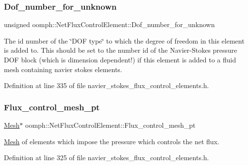 \subsubsection{\texorpdfstring{Dof\+\_\+number\+\_\+for\+\_\+unknown}{Dof\_number\_for\_unknown}}
{\footnotesize\ttfamily unsigned oomph\+::\+Net\+Flux\+Control\+Element\+::\+Dof\+\_\+number\+\_\+for\+\_\+unknown\hspace{0.3cm}{\ttfamily [private]}}



The id number of the \char`\"{}\+D\+O\+F type\char`\"{} to which the degree of freedom in this element is added to. This should be set to the number id of the Navier-\/\+Stokes pressure D\+OF block (which is dimension dependent!) if this element is added to a fluid mesh containing navier stokes elements. 



Definition at line 335 of file navier\+\_\+stokes\+\_\+flux\+\_\+control\+\_\+elements.\+h.

\mbox{\label{classoomph_1_1NetFluxControlElement_a38fc3c20ff284af95fdcd83527edd94f}} 
\subsubsection{\texorpdfstring{Flux\+\_\+control\+\_\+mesh\+\_\+pt}{Flux\_control\_mesh\_pt}}
{\footnotesize\ttfamily \hyperlink{classoomph_1_1Mesh}{Mesh}$\ast$ oomph\+::\+Net\+Flux\+Control\+Element\+::\+Flux\+\_\+control\+\_\+mesh\+\_\+pt\hspace{0.3cm}{\ttfamily [private]}}



\hyperlink{classoomph_1_1Mesh}{Mesh} of elements which impose the pressure which controls the net flux. 



Definition at line 325 of file navier\+\_\+stokes\+\_\+flux\+\_\+control\+\_\+elements.\+h.

\mbox{\label{classoomph_1_1NetFluxControlElement_af3cf3627b1db5ad3303ef946efe5fc2f}} 
